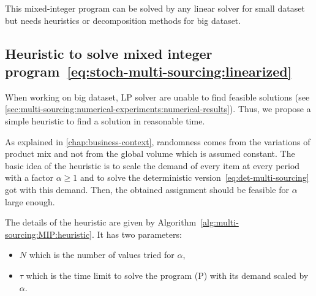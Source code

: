 This mixed-integer program can be solved by any linear solver for small dataset but needs heuristics or decomposition methods for big dataset.


\subsection{Heuristic to solve mixed integer program~\eqref{eq:stoch-multi-sourcing:linearized}}


When working on big dataset, LP solver are unable to find feasible solutions (see \cref{sec:multi-sourcing:numerical-experiments:numerical-results}).
Thus, we propose a simple heuristic to find a solution in reasonable time.


As explained in \cref{chap:business-context}, randomness comes from the variations of product mix and not from the global volume which is assumed constant.
The basic idea of the heuristic is to scale the demand of every item at every period with a factor $\alpha\ge1$ and to solve the deterministic version~\eqref{eq:det-multi-sourcing} got with this demand.
Then, the obtained assignment should be feasible for $\alpha$ large enough.


The details of the heuristic are given by Algorithm~\ref{alg:multi-sourcing:MIP:heuristic}.
It has two parameters:
\begin{itemize}
  \item $N$ which is the number of values tried for $\alpha$,
  \item $\tau$ which is the time limit to solve the program (P) with its demand scaled by $\alpha$.
\end{itemize}


